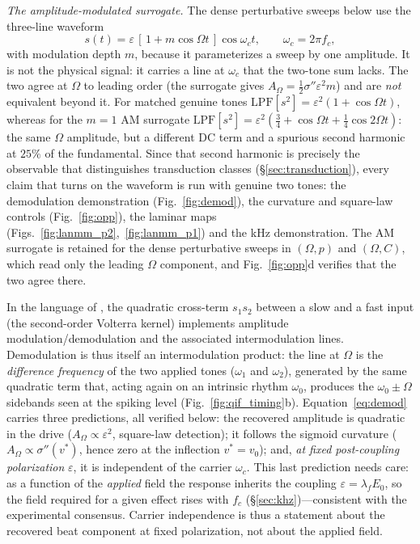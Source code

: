 \documentclass[11pt,a4paper]{article}
\newcommand{\Sig}{\sigma}
\newcommand{\half}{\tfrac{1}{2}}
\providecommand{\DIFdeltex}[1]{{\protect\color{red} \scriptsize #1}} %
\providecommand{\DIFdelbegin}{} %
\providecommand{\DIFdelend}{} %
\providecommand{\DIFdel}[1]{\texorpdfstring{\DIFdeltex{#1}}{}} %
\begin{document}
\emph{The amplitude-modulated surrogate.} The dense perturbative sweeps below use the
three-line waveform
\begin{equation}
s(t)=\varepsilon\,[\,1+m\cos\Omega t\,]\cos\omega_c t,\qquad \omega_c=2\pi f_c ,
\label{eq:amsur}
\end{equation}
with modulation depth $m$, because it parameterizes a sweep by one amplitude. It is not
the physical signal: it carries a line at $\omega_c$ that the two-tone sum lacks. The two
agree at $\Omega$ to leading order (the surrogate gives
$A_\Omega=\half\Sig''\varepsilon^2m$) and are \emph{not} equivalent beyond it. For matched genuine tones $\mathrm{LPF}[s^2]=\varepsilon^2(1+\cos\Omega t)$,
whereas for the $m=1$ AM surrogate
$\mathrm{LPF}[s^2]=\varepsilon^2(\tfrac34+\cos\Omega t+\tfrac14\cos2\Omega t)$: the same
$\Omega$ amplitude, but a different DC term and a spurious second harmonic at $25\%$ of
the fundamental. Since that second harmonic is \DIFdelbegin \DIFdel{precisely }\DIFdelend the observable that
distinguishes transduction classes (\S\ref{sec:transduction}), every claim that turns on
the waveform is run with genuine two tones: the demodulation demonstration
(Fig.~\ref{fig:demod}), the curvature and square-law controls (Fig.~\ref{fig:opp}), the
laminar maps (Figs.~\ref{fig:lanmm_p2},~\ref{fig:lanmm_p1}) and the kHz demonstration.
The AM surrogate is retained for the dense perturbative sweeps in $(\Omega,p)$ and
$(\Omega,C)$, which read only the leading $\Omega$ component, and
Fig.~\ref{fig:opp}d verifies that the two agree there.

In the language of \cite{ruffini2025ham}, the quadratic cross-term $s_1 s_2$ between a
slow and a fast input (the second-order Volterra kernel) implements amplitude
modulation/demodulation and the associated intermodulation lines.
Demodulation is thus itself an intermodulation product: the line at $\Omega$ is the
\emph{difference frequency} of the two applied tones ($\omega_1$ and $\omega_2$),
generated by the same quadratic term that, acting again on an intrinsic
rhythm $\omega_0$, produces the $\omega_0\pm\Omega$ sidebands seen at the spiking level
(Fig.~\ref{fig:qif_timing}b).
Equation~\eqref{eq:demod} carries three predictions, all verified below: the
recovered amplitude is quadratic in the drive ($A_\Omega\propto\varepsilon^2$,
square-law detection); it follows the sigmoid curvature
($A_\Omega\propto\Sig''(v^*)$, hence zero at the inflection $v^*=v_0$); and, \emph{at
fixed post-coupling polarization} $\varepsilon$, it is independent of the carrier
$\omega_c$. This last prediction needs care: as a function of the \emph{applied} field the
response inherits the coupling $\varepsilon=\lambda_f E_0$, so the field required for a
given effect rises with $f_c$ (\S\ref{sec:khz})---consistent with the experimental
consensus. Carrier independence is thus a statement about the recovered beat component at fixed
polarization, not about the applied field.
\end{document}
